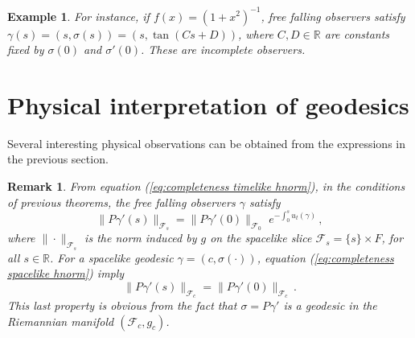 \documentclass[12pt]{article}
\DeclareMathOperator{\pt}{\partial_t}
\newtheorem{rem}[defi]{Remark}
\newtheorem{ex}[defi]{Example}
\def\R{\mathbb R}
\def\f{\mathcal F}
\begin{document}
\begin{ex}
    For instance, if $f(x) =  (1+x^2)^{-1}$, free falling observers satisfy $\gamma(s) = (s,\sigma(s)) = (s,\tan (Cs+D))$, where $C,D\in \R$ are constants fixed by $\sigma(0)$ and $\sigma'(0)$. These are incomplete observers. %

\end{ex}

\section{Physical interpretation of geodesics}\label{sect-phys}
Several interesting physical observations can be obtained from the expressions in the previous section.

\begin{rem}
\upshape
    From equation (\ref{eq:completeness timelike hnorm}), in the conditions of previous theorems, the free falling observers $\gamma$ satisfy
    \begin{equation}\label{eq:velocidad relativa comoviles GT}
        \|P^{\pt} \gamma' (s)\|_{\f_s} =\|P^{\pt} \gamma'(0)\|_{\f_0}\,\, e^{-\int_0^s u_t(\gamma)}\,,
    \end{equation}
    where $\| \cdot\|_{\f_s}$ is the norm induced by $g$ on the spacelike slice $\f_s = \{s\}\times F$, for all $s\in \R$. For a spacelike geodesic $\gamma=(c,\sigma(\cdot))$, equation (\ref{eq:completeness spacelike hnorm}) imply 
    \begin{equation}
        \|P^{\pt} \gamma'(s)\|_{\f_c} = \|P^{\pt} \gamma'(0)\|_{\f_c}\,.
    \end{equation}
    This last property is obvious from the fact that $\sigma = P^{\pt} \gamma'$ is a geodesic in the Riemannian manifold $(\f_c,g_c)$.
\end{rem}
\end{document}
